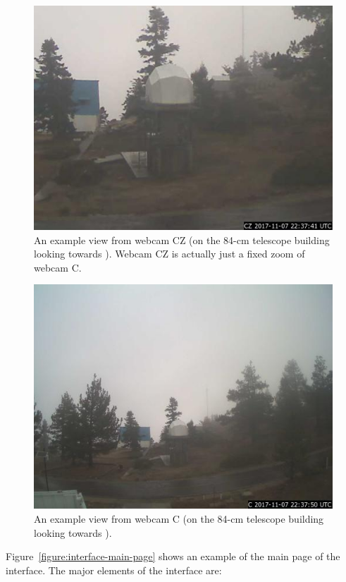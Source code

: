 \begin{figure}
\begin{center}
\includegraphics[width=0.8\linewidth]{figures/interface-ddoti-webcam-cz.jpg}
\end{center}
\caption{An example view from webcam CZ (on the 84-cm telescope building looking towards {\projectname}). Webcam CZ is actually just a fixed zoom of webcam C.}
\label{figure:interface-webcam-cz}
\end{figure}

\begin{figure}
\begin{center}
\includegraphics[width=0.8\linewidth]{figures/interface-ddoti-webcam-c.jpg}
\end{center}
\caption{An example view from webcam C (on the 84-cm telescope building looking towards {\projectname}).}
\label{figure:interface-webcam-c}
\end{figure}

\fi

Figure~\ref{figure:interface-main-page} shows an example of the main page of the interface. The major elements of the interface are:

